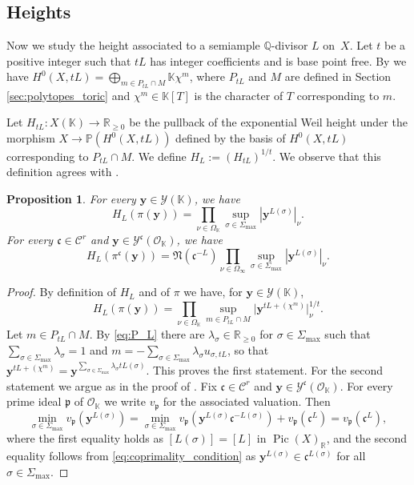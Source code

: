 \documentclass[11pt]{article}
\numberwithin{equation}{section}
\newcommand{\bfy}{\boldsymbol{y}}
\newcommand{\OO}{\mathcal{O}}
\newcommand\RR{\mathbb{R}}
\newcommand\QQ{\mathbb{Q}}
\newcommand{\KK}{\mathbb{K}}
\newcommand\PP{\mathbb{P}}
\newcommand\p{\mathfrak{p}}
\newcommand{\idealnorm}{\mathfrak{N}}
\DeclareMathOperator{\pic}{Pic}
\newtheorem{prop}[theorem]{Proposition}
\theoremstyle{definition}
\numberwithin{theorem}{section}
\begin{document}
\subsection{Heights}
\label{sec:heights}
Now we study the height associated to a semiample $\QQ$-divisor $L$ on~$X$.
Let $t$ be a positive integer such that $tL$ has integer coefficients and is base point free.
By \cite[Prop.\,4.3.3]{MR2810322} we have
$H^0(X, tL)=\bigoplus_{m\in P_{tL}\cap M}\KK\chi^m$, where $P_{tL}$ and $M$
are defined in Section \ref{sec:polytopes_toric} and $\chi^m\in \KK[T]$ is
the character of $T$ corresponding to $m$.

Let $H_{tL}:X(\KK)\to\RR_{\geq0}$ be the pullback of the exponential Weil height under
the morphism $X\to\PP(H^0(X,tL))$ defined by the basis of $H^0(X,tL)$ corresponding
to $P_{tL}\cap M$.
We define $H_{L}:=(H_{tL})^{1/t}$.
We observe that this definition agrees with \cite[\S 2.1]{MR1369408}.
\begin{prop}
\label{prop:height}
For every $\bfy \in \mathscr Y({\KK})$, we have
\[
H_L(\pi(\bfy))
=\prod_{\nu\in\Omega_{\KK}} \sup_{\sigma\in\Sigma_{\max}} |\bfy^{L(\sigma)}|_{\nu}.
\]
For every $\mathfrak c\in\mathcal{C}^{r}$ and
$\bfy\in \mathscr Y^{\mathfrak c}(\mathcal{O}_{\KK})$, we have
\[
H_L(\pi^{\mathfrak c}(\bfy))
=\idealnorm \left(\mathfrak c^{-L}\right)
\prod_{\nu\in\Omega_\infty} \sup_{\sigma\in\Sigma_{\max}} | \bfy^{L(\sigma)}|_{\nu}.
\]
\end{prop}
\begin{proof}
By definition of $H_L$ and of $\pi$ we have, for $\bfy \in \mathscr Y({\KK})$,
\[
H_L(\pi(\bfy))
=\prod_{\nu\in\Omega_{\KK}} \sup_{m\in P_{tL}\cap M} \bigl| \bfy^{tL+(\chi^m)} \bigr|_{\nu}^{1/t}.
\]
Let $m\in P_{tL}\cap M$.
By \eqref{eq:P_L} there are $\lambda_\sigma\in\RR_{\geq0}$ for
$\sigma\in\Sigma_{\max}$ such that
$\sum_{\sigma\in\Sigma_{\max}}\lambda_\sigma=1$
and $m=-\sum_{\sigma\in \Sigma_{\max}}\lambda_\sigma u_{\sigma,tL}$, so that
$\bfy^{tL+(\chi^m)}= \bfy^{\sum_{\sigma\in \Sigma_{\max}}\lambda_\sigma tL(\sigma)}$.
This proves the first statement.
For the second statement we argue as in the proof of \cite[Prop.\,2]{MR3514738}.
Fix $\mathfrak c\in\mathcal{C}^{r}$ and
$\bfy\in \mathscr Y^{\mathfrak c}(\mathcal{O}_{\KK})$.
For every prime ideal $\mathfrak p$ of $\OO_{\KK}$ we write $v_\p$ for the
associated valuation. Then
\[
\min_{\sigma\in\Sigma_{\max}} v_\p(\bfy^{L(\sigma)})
=\min_{\sigma\in\Sigma_{\max}} v_\p(\bfy^{L(\sigma)}\mathfrak c^{-L(\sigma)})
+ v_\p(\mathfrak c^L)=v_\p(\mathfrak c^L),
\]
where the first equality holds as $[L(\sigma)]=[L]$ in $\pic(X)_{\RR}$, and the second equality
follows from \eqref{eq:coprimality_condition} as
$\bfy^{L(\sigma)} \in \mathfrak c^{L(\sigma)}$ for all $\sigma\in\Sigma_{\max}$.
\end{proof}
\end{document}
